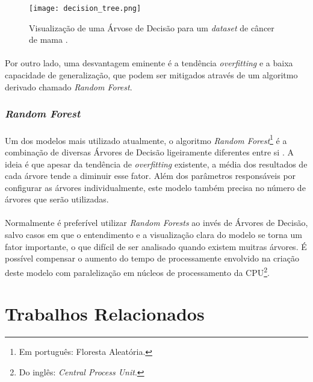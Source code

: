\begin{figure}[h]
    \texttt{[image: decision\_tree.png]}
    \centering
    \caption{Visualização de uma Árvose de Decisão para um \textit{dataset} de câncer de mama \cite{muller2016introduction}.}
    \label{fig:9}
\end{figure}

\paragraph{} Por outro lado, uma desvantagem eminente é a tendência \textit{overfitting} e a baixa capacidade de generalização, que podem ser mitigados através de um algoritmo derivado chamado \textit{Random Forest}.


\subsubsection*{\textit{Random Forest}}

\paragraph{} Um dos modelos mais utilizado atualmente, o algoritmo \textit{Random Forest}\footnote{Em português: Floresta Aleatória.} é a combinação de diversas Árvores de Decisão ligeiramente diferentes entre si \cite{muller2016introduction}. A ideia é que apesar da tendência de \textit{overfitting} existente, a média dos resultados de cada árvore tende a diminuir esse fator. Além dos parâmetros responsáveis por configurar as árvores individualmente, este modelo também precisa no número de árvores que serão utilizadas.

\paragraph{} Normalmente é preferível utilizar \textit{Random Forests} ao invés de Árvores de Decisão, salvo casos em que o entendimento e a visualização clara do modelo se torna um fator importante, o que difícil de ser analisado quando existem muitras árvores. É possível compensar o aumento do tempo de processamente envolvido na criação deste modelo com paralelização em núcleos de processamento da CPU\footnote{Do inglês: \textit{Central Process Unit}.}.

\section{Trabalhos Relacionados}

